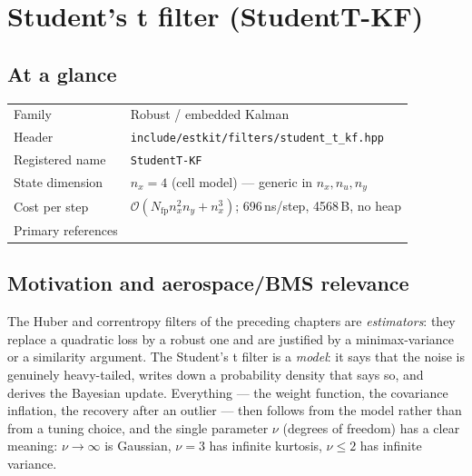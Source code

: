 \providecommand{\vf}{\bm{f}} \providecommand{\vh}{\bm{h}}
\providecommand{\vd}{\bm{d}} \providecommand{\mM}{\bm{M}}
\providecommand{\va}{\bm{a}} \providecommand{\vb}{\bm{b}}

\chapter{Student's t filter (StudentT-KF)}
\label{ch:studenttkf}

\section*{At a glance}
\begin{tabular}{@{}l>{\raggedright\arraybackslash}p{}@{}}
Family & Robust / embedded Kalman \\
Header & \texttt{include/estkit/filters/student\_t\_kf.hpp} \\
Registered name & \texttt{StudentT-KF} \\
State dimension & $n_x = 4$ (cell model) --- generic in $n_x, n_u, n_y$ \\
Cost per step & $\mathcal{O}(N_{\mathrm{fp}} n_x^2 n_y + n_x^3)$; 696\,ns/step, 4568\,B, no heap \\
Primary references & \cite{roth2013studentt,agamennoni2012heavytailed,huang2016robustt,kotz2004multivariatet} \\
\end{tabular}

\section{Motivation and aerospace/BMS relevance}
The Huber and correntropy filters of the preceding chapters are \emph{estimators}: they replace a
quadratic loss by a robust one and are justified by a minimax-variance or a similarity argument.
The Student's t filter is a \emph{model}: it says that the noise is genuinely heavy-tailed, writes
down a probability density that says so, and derives the Bayesian update.  Everything --- the
weight function, the covariance inflation, the recovery after an outlier --- then follows from the
model rather than from a tuning choice, and the single parameter $\nu$ (degrees of freedom) has a
clear meaning: $\nu\to\infty$ is Gaussian, $\nu=3$ has infinite kurtosis, $\nu\le2$ has infinite
variance.

